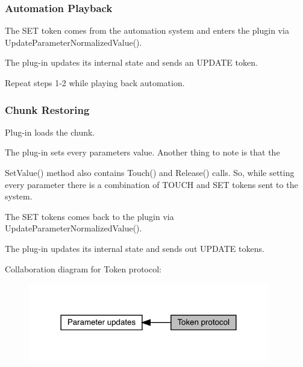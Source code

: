 \hypertarget{a00822_tokenProtocol_standardTokenOperation_automationPlayback}{}\subsubsection{Automation Playback}\label{a00822_tokenProtocol_standardTokenOperation_automationPlayback}

\begin{DoxyEnumerate}
\item The S\+ET token comes from the automation system and enters the plugin via Update\+Parameter\+Normalized\+Value().
\item The plug-\/in updates it\textquotesingle{}s internal state and sends an U\+P\+D\+A\+TE token.
\item Repeat steps 1-\/2 while playing back automation.
\end{DoxyEnumerate}

\hypertarget{a00822_tokenProtocol_standardTokenOperation_chunkRestoring}{}\subsubsection{Chunk Restoring}\label{a00822_tokenProtocol_standardTokenOperation_chunkRestoring}

\begin{DoxyEnumerate}
\item Plug-\/in loads the chunk.
\item The plug-\/in sets every parameters value. Another thing to note is that the
\item Set\+Value() method also contains Touch() and Release() calls. So, while setting every parameter there is a combination of T\+O\+U\+CH and S\+ET tokens sent to the system.
\item The S\+ET tokens comes back to the plugin via Update\+Parameter\+Normalized\+Value().
\item The plug-\/in updates it\textquotesingle{}s internal state and sends out U\+P\+D\+A\+TE tokens.
\end{DoxyEnumerate}

 Collaboration diagram for Token protocol\+:
\nopagebreak
\begin{figure}[H]
\begin{center}
\leavevmode
\includegraphics[width=298pt]{a00822}
\end{center}
\end{figure}
